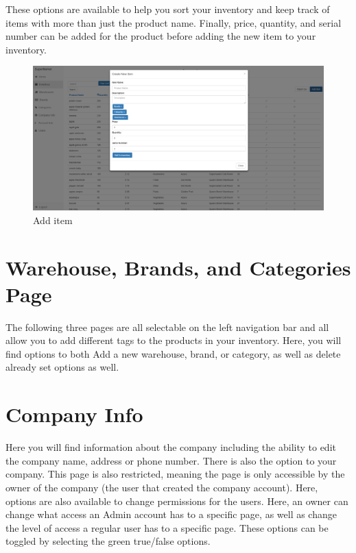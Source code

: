 \documentclass[12pt, titlepage]{article}
\begin{document}
These options are available to help you sort your inventory and keep track of items with more than just the product name. Finally, price, quantity, and serial number can be added for the product before adding the new item to your inventory.

\begin{figure}[h]
\centering
\includegraphics[width=\linewidth]{sims6.PNG}
\caption{Add item}
\label{fig:figure4}
\end{figure}

\section{Warehouse, Brands, and Categories Page}
\label{sec:warehouse}
The following three pages are all selectable on the left navigation bar and all allow you to add different tags to the products in your inventory. Here, you will find options to both Add a new warehouse, brand, or category, as well as delete already set options as well.

\section{Company Info}
\label{sec:companyinfo}
Here you will find information about the company including the ability to edit the company name, address or phone number. There is also the option to your company. This page is also restricted, meaning the page is only accessible by the owner of the company (the user that created the company account). Here, options are also available to change permissions for the users. Here, an owner can change what access an Admin account has to a specific page, as well as change the level of access a regular user has to a specific page. These options can be toggled by selecting the green true/false options.
\end{document}
